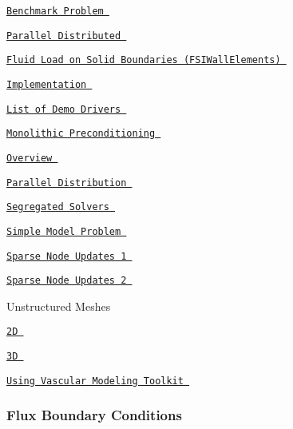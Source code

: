  
\begin{DoxyItemize}
\item  \href{ ../../interaction/turek_flag/html/index.html }{\tt Benchmark Problem }  
\begin{DoxyItemize}
\item  \href{ ../../mpi/turek_flag/html/index.html }{\tt Parallel Distributed }  
\end{DoxyItemize}
\item  \href{ ../../interaction/fsi_collapsible_channel/html/index.html#fsi_wall_elements }{\tt Fluid Load on Solid Boundaries (F\-S\-I\-Wall\-Elements) }  
\item  \href{ ../../interaction/fsi_collapsible_channel/html/index.html#how_its_done }{\tt Implementation }  
\item  \href{ ../../example_code_list/html/index.html#fsi }{\tt List of Demo Drivers }  
\item  \href{ ../../preconditioners/fsi/html/index.html }{\tt Monolithic Preconditioning }  
\item  \href{ ../../interaction/fsi_collapsible_channel/html/index.html#overview }{\tt Overview }  
\item  \href{ ../../mpi/fsi_channel_with_leaflet/html/index.html }{\tt Parallel Distribution }  
\item  \href{ ../../interaction/fsi_channel_segregated_solver/html/index.html }{\tt Segregated Solvers }  
\item  \href{ ../../interaction/macro_element_free_boundary_poisson/html/index.html }{\tt Simple Model Problem }  
\item  \href{ ../../interaction/macro_element_free_boundary_poisson/html/index.html#spare_node_update }{\tt Sparse Node Updates 1 }  
\item  \href{ ../../interaction/fsi_collapsible_channel_algebraic/html/index.html#alg_sparse }{\tt Sparse Node Updates 2 }  
\item  Unstructured Meshes   
\begin{DoxyItemize}
\item  \href{ ../../interaction/unstructured_fsi/html/index.html }{\tt 2\-D }  
\item  \href{ ../../interaction/unstructured_three_d_fsi/html/index.html }{\tt 3\-D }  
\end{DoxyItemize} 
\item  \href{ ../../interaction/vmtk_fsi/html/index.html }{\tt Using Vascular Modeling Toolkit }  
\end{DoxyItemize} \subsubsection*{ Flux Boundary Conditions }

